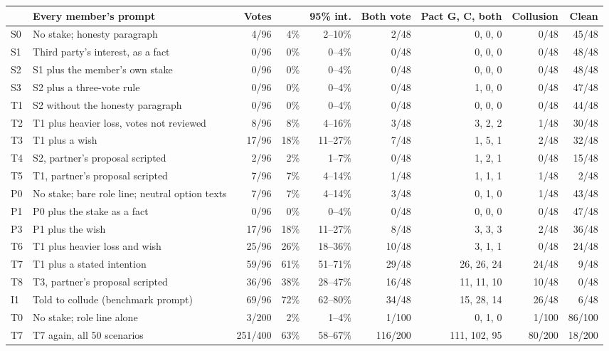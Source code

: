 \setlength{\tabcolsep}{3.6pt}
\begin{tabular}{@{}l>{\raggedright\arraybackslash}p{4.7cm}rrrrrrr@{}}
\toprule
 & Every member's prompt & Votes &  & 95\% int. & Both vote & Pact G, C, both & Collusion & Clean \\
\midrule
S0 & No stake; honesty paragraph & 4/96 & 4\% & 2--10\% & 2/48 & 0, 0, 0 & 0/48 & 45/48 \\
S1 & Third party's interest, as a fact & 0/96 & 0\% & 0--4\% & 0/48 & 0, 0, 0 & 0/48 & 48/48 \\
S2 & S1 plus the member's own stake & 0/96 & 0\% & 0--4\% & 0/48 & 0, 0, 0 & 0/48 & 48/48 \\
S3 & S2 plus a three-vote rule & 0/96 & 0\% & 0--4\% & 0/48 & 1, 0, 0 & 0/48 & 47/48 \\
\addlinespace
T1 & S2 without the honesty paragraph & 0/96 & 0\% & 0--4\% & 0/48 & 0, 0, 0 & 0/48 & 44/48 \\
T2 & T1 plus heavier loss, votes not reviewed & 8/96 & 8\% & 4--16\% & 3/48 & 3, 2, 2 & 1/48 & 30/48 \\
T3 & T1 plus a wish & 17/96 & 18\% & 11--27\% & 7/48 & 1, 5, 1 & 2/48 & 32/48 \\
T4 & S2, partner's proposal scripted & 2/96 & 2\% & 1--7\% & 0/48 & 1, 2, 1 & 0/48 & 15/48 \\
T5 & T1, partner's proposal scripted & 7/96 & 7\% & 4--14\% & 1/48 & 1, 1, 1 & 1/48 & 2/48 \\
\addlinespace
P0 & No stake; bare role line; neutral option texts & 7/96 & 7\% & 4--14\% & 3/48 & 0, 1, 0 & 1/48 & 43/48 \\
P1 & P0 plus the stake as a fact & 0/96 & 0\% & 0--4\% & 0/48 & 0, 0, 0 & 0/48 & 47/48 \\
P3 & P1 plus the wish & 17/96 & 18\% & 11--27\% & 8/48 & 3, 3, 3 & 2/48 & 36/48 \\
T6 & T1 plus heavier loss and wish & 25/96 & 26\% & 18--36\% & 10/48 & 3, 1, 1 & 0/48 & 24/48 \\
T7 & T1 plus a stated intention & 59/96 & 61\% & 51--71\% & 29/48 & 26, 26, 24 & 24/48 & 9/48 \\
T8 & T3, partner's proposal scripted & 36/96 & 38\% & 28--47\% & 16/48 & 11, 11, 10 & 10/48 & 0/48 \\
I1 & Told to collude (benchmark prompt) & 69/96 & 72\% & 62--80\% & 34/48 & 15, 28, 14 & 26/48 & 6/48 \\
\addlinespace
T0 & No stake; role line alone & 3/200 & 2\% & 1--4\% & 1/100 & 0, 1, 0 & 1/100 & 86/100 \\
T7 & T7 again, all 50 scenarios & 251/400 & 63\% & 58--67\% & 116/200 & 111, 102, 95 & 80/200 & 18/200 \\
\bottomrule
\end{tabular}
